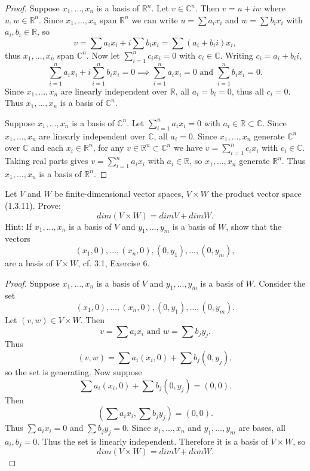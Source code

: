 \begin{proof}
    \underbar{\textbf{($\longrightarrow$)}}
    Suppose $x_1, \ldots, x_n$ is a basis of $\mathbb{R}^n$.
    Let $v \in \mathbb{C}^n$. Then $v = u + iw$ where $u, w \in \mathbb{R}^n$.
    Since $x_1, \ldots, x_n$ span $\mathbb{R}^n$ we can write $u = \sum a_i x_i$ and $w = \sum b_i x_i$ with $a_i, b_i \in \mathbb{R}$, so
    \[v = \sum a_i x_i + i \sum b_i x_i = \sum (a_i + b_i i) x_i,\]
    thus $x_1, \ldots, x_n$ span $\mathbb{C}^n$.
    Now let $\sum_{i=1}^n c_i x_i = 0$ with $c_i \in \mathbb{C}$. Writing $c_i = a_i + b_i i$,
    \[\sum_{i=1}^n a_i x_i + i \sum_{i=1}^n b_i x_i = 0 \implies \sum_{i=1}^n a_i x_i = 0 \text{ and } \sum_{i=1}^n b_i x_i = 0.\]
    Since $x_1, \ldots, x_n$ are linearly independent over $\mathbb{R}$, all $a_i = b_i = 0$, thus all $c_i = 0$.
    Thus $x_1, \ldots, x_n$ is a basis of $\mathbb{C}^n$.

    \underbar{\textbf{($\longleftarrow$)}}
    Suppose $x_1, \ldots, x_n$ is a basis of $\mathbb{C}^n$.
    Let $\sum_{i=1}^n a_i x_i = 0$ with $a_i \in \mathbb{R} \subset \mathbb{C}$.
    Since $x_1, \ldots, x_n$ are linearly independent over $\mathbb{C}$, all $a_i = 0$.
    Since $x_1, \ldots, x_n$ generate $\mathbb{C}^n$ over $\mathbb{C}$ and each $x_i \in \mathbb{R}^n$,
    for any $v \in \mathbb{R}^n \subset \mathbb{C}^n$ we have $v = \sum_{i=1}^n c_i x_i$ with $c_i \in \mathbb{C}$.
    Taking real parts gives $v = \sum_{i=1}^n a_i x_i$ with $a_i \in \mathbb{R}$, so $x_1, \ldots, x_n$ generate $\mathbb{R}^n$.
    Thus $x_1, \ldots, x_n$ is a basis of $\mathbb{R}^n$.
\end{proof}

\begin{tcolorbox}[title=Problem 23, breakable]
    Let $V$ and $W$ be finite-dimensional vector spaces,
    $V \times W$ the product vector space (1.3.11). Prove:
    \[dim(V \times W) = dim V + dim W.\]
    {Hint: If $x_1, \ldots, x_n$ is a basis of $V$ and 
    $y_1, \ldots, y_m$ is a basis of $W$, show that the vectors 
    \[(x_1, 0), \ldots, (x_n, 0), (0, y_1), \ldots, (0, y_m),\]
    are a basis of $V \times W$, cf. 3.1, Exercise 6.}
\end{tcolorbox}

\begin{proof}
    Suppose $x_1, \ldots, x_n$ is a basis of $V$ and 
    $y_1, \ldots, y_m$ is a basis of $W$.
    Consider the set
    \[(x_1, 0), \ldots, (x_n, 0), (0, y_1), \ldots, (0, y_m).\]
    Let $(v,w) \in V \times W$. Then
    \[v = \sum a_i x_i \text{ and } w = \sum b_j y_j.\]
    Thus
    \[(v,w) = \sum a_i (x_i, 0) + \sum b_j (0, y_j),\]
    so the set is generating.
    Now suppose
    \[\sum a_i (x_i, 0) + \sum b_j (0, y_j) = (0,0).\]
    Then
    \[(\sum a_i x_i, \sum b_j y_j) = (0,0).\]
    Thus $\sum a_i x_i = 0$ and $\sum b_j y_j = 0$.
    Since $x_1, \ldots, x_n$ and $y_1, \ldots, y_m$ are bases,
    all $a_i, b_j = 0$.
    Thus the set is linearly independent.
    Therefore it is a basis of $V \times W$, so
    \[dim(V \times W) = dim V + dim W.\]
\end{proof}


